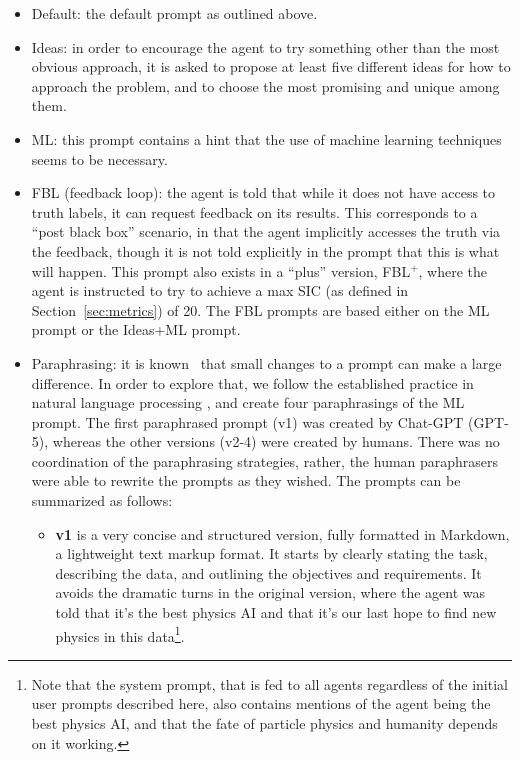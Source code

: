 \documentclass[submission, Phys]{SciPost}
\begin{document}
\begin{itemize}
    \item Default: the default prompt as outlined above.
    \item Ideas: in order to encourage the agent to try something other than the most obvious approach, it is asked to propose at least five different ideas for how to approach the problem, and to choose the most promising and unique among them.
    \item ML: this prompt contains a hint that the use of machine learning techniques seems to be necessary.
    \item FBL (feedback loop): the agent is told that while it does not have access to truth labels, it can request feedback on its results. This corresponds to a ``post black box'' scenario, in that the agent implicitly accesses the truth via the feedback, though it is not told explicitly in the prompt that this is what will happen. This prompt also exists in a ``plus'' version, FBL$^+$, where the agent is instructed to try to achieve a max SIC (as defined in Section~\ref{sec:metrics}) of 20. The FBL prompts are based either on the ML prompt or the Ideas+ML prompt.
    \item Paraphrasing: it is known~\cite{sclarquantifying} that small changes to a prompt can make a large difference. In order to explore that, we follow the established practice in natural language processing \cite{holtermann-etal-2025-around, bui-etal-2025-multi3hate},  and create four paraphrasings of the ML prompt. The first paraphrased prompt (v1) was created by Chat-GPT (GPT-5), whereas the other versions (v2-4) were created by humans. There was no coordination of the paraphrasing strategies, rather, the human paraphrasers were able to rewrite the prompts as they wished. The prompts can be summarized as follows:
    \begin{itemize}
        \item \textbf{v1} is a very concise and structured version, fully formatted in Markdown, a lightweight text markup format. It starts by clearly stating the task, describing the data, and outlining the objectives and requirements. It avoids the dramatic turns in the original version, where the agent was told that it's the best physics AI and that it's our last hope to find new physics in this data\footnote{Note that the system prompt, that is fed to all agents regardless of the initial user prompts described here, also contains mentions of the agent being the best physics AI, and that the fate of particle physics and humanity depends on it working.}.

\end{itemize}
\end{itemize}
\end{document}
